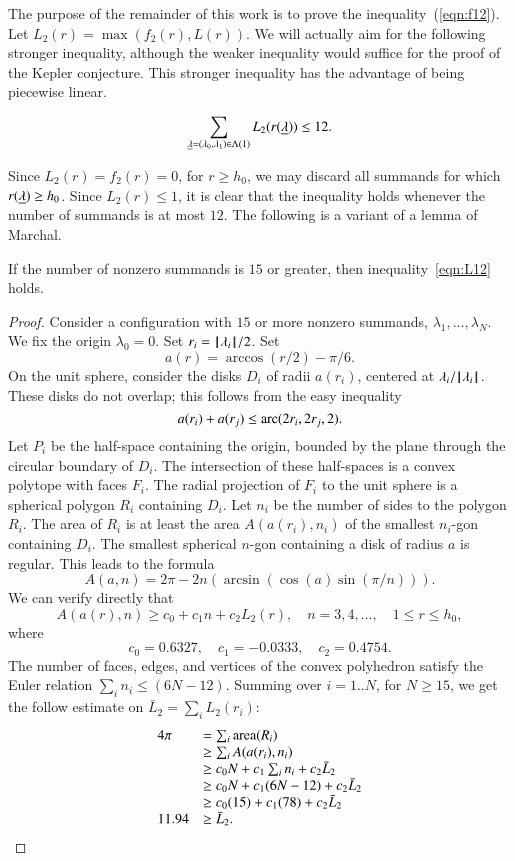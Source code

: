 The purpose of the remainder of this work is to prove the inequality~(\ref{eqn:f12}).   Let $L_2(r) = \max(f_2(r),L(r))$.  We will actually aim for the 
following stronger
inequality, although the weaker inequality would suffice for the proof of the Kepler conjecture.  This stronger inequality has the advantage of being piecewise linear.

\begin{conjecture}
\begin{equation}\label{eqn:L12}
\sum_{{\underline{\lambda}}=(\lambda_0,\lambda_1)\in\Lambda(1)} L_2(r({\underline{\lambda}})) \le 12.
\end{equation}
\end{conjecture}
Since $L_2(r) = f_2(r) = 0$, for $r\ge h_0$, we may discard all summands for which $r({\underline{\lambda}})\ge h_0$.  Since $L_2(r)\le 1$, it is clear that the inequality holds whenever the number of summands is at most $12$. The following is a variant of a lemma of Marchal.


\begin{lemma}  If the number of nonzero summands is $15$ or greater, then inequality~\ref{eqn:L12} holds.
\end{lemma}

\begin{proof} 
Consider a configuration with $15$ or more nonzero summands, $\lambda_1,\ldots,\lambda_N$. 
We fix the origin $\lambda_0=0$.  Set $r_i = {{\hskip0.1em|\hskip-0.15em|\hskip0.1em}\lambda_i{\hskip0.1em|\hskip-0.15em|\hskip0.1em}}/2$.  Set
$$
a(r) = \arccos(r/2) - \pi/6.
$$
On the unit sphere,  consider the disks $D_i$ of radii $a(r_i)$, centered at $\lambda_i/{{\hskip0.1em|\hskip-0.15em|\hskip0.1em}\lambda_i{\hskip0.1em|\hskip-0.15em|\hskip0.1em}}$.  These disks do not overlap; this follows from the easy inequality 
$$
a(r_i) + a(r_j) \le {\operatorname{arc}}(2r_i,2r_j,2).
$$
Let $P_i$ be the half-space containing the origin, bounded by the plane through the circular boundary of $D_i$.  The intersection of these half-spaces is a convex polytope with faces $F_i$.  The radial projection of $F_i$ to the unit sphere is a spherical polygon $R_i$ containing $D_i$.  Let $n_i$ be the number of sides to the polygon $R_i$.  The area of $R_i$ is at least the area $A(a(r_i),n_i)$ of the smallest $n_i$-gon containing $D_i$.  The smallest spherical $n$-gon containing a disk of radius $a$ is regular.  This leads to the formula
$$
A(a,n) = 2\pi - 2 n (\arcsin(\cos(a)\sin(\pi/n))).
$$
We can verify directly that
$$
A(a(r),n) \ge c_0 + c_1 n + c_2 L_2(r),\quad
n = 3,4,\ldots,\quad 1\le r\le h_0,
$$
where
$$c_0 = 0.6327,\quad c_1 = -0.0333,\quad c_2 = 0.4754.$$
The number of faces, edges, and vertices of the convex
polyhedron satisfy the Euler relation $\sum_i n_i \le (6N-12)$.
Summing over $i=1..N$, for $N\ge 15$, we get the follow
estimate on $\bar L_2 = \sum_i L_2(r_i)$:
$$
\begin{array}{lll}
4\pi &= \sum_i{\operatorname{area}}(R_i)\\
     &\ge \sum_i A(a(r_i),n_i) \\
     &\ge c_0 N +c_1\sum_i n_i + c_2 \bar L_2\\
     &\ge c_0 N +c_1 (6N-12) + c_2 \bar L_2\\
     &\ge c_0 (15) +c_1 (78) + c_2 \bar L_2\\
11.94 &\ge \bar L_2. 
\end{array}
$$
\end{proof} 


